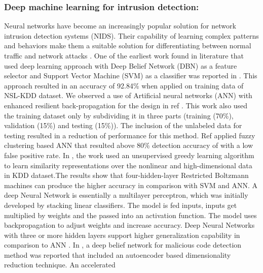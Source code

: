 \documentclass[runningheads]{llncs}
\begin{document}
\subsubsection*{Deep machine learning for intrusion detection:}
Neural networks have become an increasingly popular solution for network intrusion detection systems (NIDS). Their capability of learning complex patterns and behaviors make them a suitable solution for differentiating between normal traffic and network attacks \cite{Yisroel2018}. One of the earliest work found in literature that used deep learning approach with Deep Belief Network (DBN) as a feature selector and Support Vector Machine (SVM) as a classifier was reported in \cite{salama2011}. This approach resulted in an accuracy of 92.84\% when applied on training data of NSL-KDD dataset. We observed a use of Artificial neural networks (ANN) with enhanced resilient back-propagation for the design  in ref \cite{Naoum2012} . This work also used the training dataset only by subdividing it in three parts (training (70\%), validation (15\%) and testing (15\%)). The inclusion of the unlabeled data for testing resulted in a reduction of performance for this method. Ref \cite{Pandeeswari2016} applied fuzzy clustering based ANN that resulted above 80\% detection accuracy of with a low false positive rate.  In \cite{Gao2014}, the work used an unsupervised greedy learning algorithm to learn similarity representations over the nonlinear and high-dimensional data in KDD dataset.The results show that four-hidden-layer Restricted Boltzmann machines can produce the higher accuracy in comparison with SVM and ANN.
A deep Neural Network is essentially a multilayer perceptron, which was initially developed by stacking linear classifiers. The model is fed inputs, inputs get multiplied by weights and the passed into an activation function. The model uses backpropagation to adjust weights and increase accuracy. Deep Neural Networks with three or more hidden layers support higher generalization capability in comparison to ANN \cite{Kaynar2017}.
In \cite{Li2015}, a deep belief network for malicious code detection method was reported that included an autoencoder based dimensionality reduction technique. An accelerated
\end{document}
